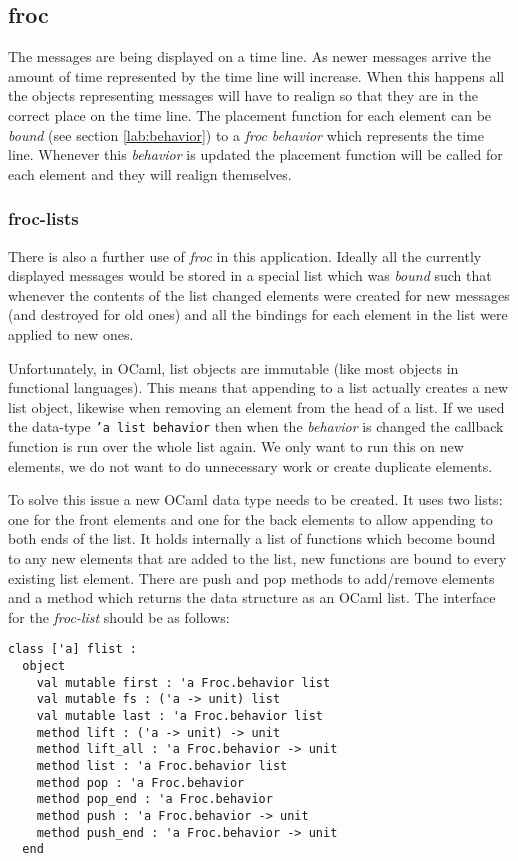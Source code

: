 \subsection{froc}
The messages are being displayed on a time line. As newer messages arrive the amount of time represented by the time line will increase. When this happens all the objects representing messages will have to realign so that they are in the correct place on the time line. The placement function for each element can be \emph{bound} (see section \ref{lab:behavior}) to a \emph{froc} \emph{behavior} which represents the time line. Whenever this \emph{behavior} is updated the placement function will be called for each element and they will realign themselves.

\subsubsection{froc-lists}
\label{lab:froc-list}
There is also a further use of \emph{froc} in this application. Ideally all the currently displayed messages would be stored in a special list which was \emph{bound} such that whenever the contents of the list changed elements were created for new messages (and destroyed for old ones) and all the bindings for each element in the list were applied to new ones.

Unfortunately, in OCaml, list objects are immutable (like most objects in functional languages). This means that appending to a list actually creates a new list object, likewise when removing an element from the head of a list. If we used the data-type \texttt{'a list behavior} then when the \emph{behavior} is changed the callback function is run over the whole list again. We only want to run this on new elements, we do not want to do unnecessary work or create duplicate elements.

To solve this issue a new OCaml data type needs to be created. It uses two lists: one for the front elements and one for the back elements to allow appending to both ends of the list. It holds internally a list of functions which become bound to any new elements that are added to the list, new functions are bound to every existing list element. There are push and pop methods to add/remove elements and a method which returns the data structure as an OCaml list.
\vfill\pagebreak
The interface for the \emph{froc-list} should be as follows:

\begin{lstlisting}[caption={flist.mli}]
class ['a] flist :
  object
    val mutable first : 'a Froc.behavior list
    val mutable fs : ('a -> unit) list
    val mutable last : 'a Froc.behavior list
    method lift : ('a -> unit) -> unit
    method lift_all : 'a Froc.behavior -> unit
    method list : 'a Froc.behavior list
    method pop : 'a Froc.behavior
    method pop_end : 'a Froc.behavior
    method push : 'a Froc.behavior -> unit
    method push_end : 'a Froc.behavior -> unit
  end
\end{lstlisting}

